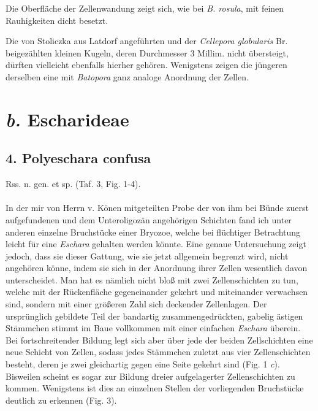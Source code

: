 \documentclass[a4paper, 11pt, oneside, german]{article}
\begin{document}
Die Oberfläche der Zellenwandung zeigt sich, wie bei \emph{B. rosula}, mit feinen Rauhigkeiten dicht besetzt.

Die von Stoliczka aus Latdorf angeführten und der \emph{Cellepora globularis} Br. beigezählten kleinen Kugeln, deren Durchmesser 3 Millim. nicht übersteigt, dürften vielleicht ebenfalls hierher gehören. Wenigstens zeigen die jüngeren derselben eine mit \emph{Batopora} ganz analoge Anordnung der Zellen.
\section{\emph{b.} Escharideae}
\subsection{4. Polyeschara confusa}
\begin{center}
Rss. n. gen. et sp. (Taf. 3, Fig. 1-4).
\end{center}
\paragraph{}
In der mir von Herrn v. Könen mitgeteilten Probe der von ihm bei Bünde zuerst aufgefundenen und dem Unteroligozän angehörigen Schichten fand ich unter anderen einzelne Bruchstücke einer Bryozoe, welche bei flüchtiger Betrachtung leicht für eine \emph{Eschara} gehalten werden könnte. Eine genaue Untersuchung zeigt jedoch, dass sie dieser Gattung, wie sie jetzt allgemein begrenzt wird, nicht angehören könne, indem sie sich in der Anordnung ihrer Zellen wesentlich davon unterscheidet. Man hat es nämlich nicht bloß mit zwei Zellenschichten zu tun, welche mit der Rückenfläche gegeneinander gekehrt und miteinander verwachsen sind, sondern mit einer größeren Zahl sich deckender Zellenlagen. Der ursprünglich gebildete Teil der bandartig zusammengedrückten, gabelig ästigen Stämmchen stimmt im Baue vollkommen mit einer einfachen \emph{Eschara} überein. Bei fortschreitender Bildung legt sich aber über jede der beiden Zellschichten eine neue Schicht von Zellen, sodass jedes Stämmchen zuletzt aus vier Zellenschichten besteht, deren je zwei gleichartig gegen eine Seite gekehrt sind (Fig. 1 \emph{c}). Bisweilen scheint es sogar zur Bildung dreier aufgelagerter Zellenschichten zu kommen. Wenigstens ist dies an einzelnen Stellen der vorliegenden Bruchstücke deutlich zu erkennen (Fig. 3).
\end{document}

